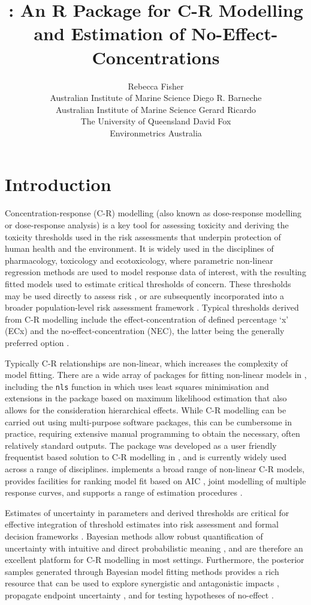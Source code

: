 \documentclass[
]{jss}
\author{
Rebecca Fisher\\Australian Institute of Marine Science \And Diego R.
Barneche\\Australian Institute of Marine Science \AND Gerard
Ricardo\\The University of Queensland \And David Fox\\Environmetrics
Australia
}
\title{\pkg{bayesnec}: An R Package for C-R Modelling and Estimation of
No-Effect-Concentrations}
\begin{document}
\hypertarget{introduction}{%
\section{Introduction}\label{introduction}}

Concentration-response (C-R) modelling (also known as dose-response
modelling or dose-response analysis) is a key tool for assessing
toxicity and deriving the toxicity thresholds used in the risk
assessments that underpin protection of human health and the
environment. It is widely used in the disciplines of pharmacology,
toxicology and ecotoxicology, where parametric non-linear regression
methods are used to model response data of interest, with the resulting
fitted models used to estimate critical thresholds of concern. These
thresholds may be used directly to assess risk \citep[e.g
see][]{fisher2018c}, or are subsequently incorporated into a broader
population-level risk assessment framework \citep[e.g.~][]{Warne2015}.
Typical thresholds derived from C-R modelling include the
effect-concentration of defined percentage `x' (ECx) and the
no-effect-concentration (NEC), the latter being the generally preferred
option \citep{Fox2008, Warne2015}.

Typically C-R relationships are non-linear, which increases the
complexity of model fitting. There are a wide array of packages for
fitting non-linear models in , including the \texttt{nls}
function in  which uses least squares minimisation and
extensions in the  package \citep{pinheiro2021} based on
maximum likelihood estimation that also allows for the consideration
hierarchical effects. While C-R modelling can be carried out using
multi-purpose software packages, this can be cumbersome in practice,
requiring extensive manual programming to obtain the necessary, often
relatively standard outputs. The  package \citep{Ritz2016} was
developed as a user friendly frequentist based solution to C-R modelling
in , and is currently widely used across a range of
disciplines.  implements a broad range of non-linear C-R
models, provides facilities for ranking model fit based on AIC
\citep{Burnham2002}, joint modelling of multiple response curves, and
supports a range of estimation procedures \citep{Ritz2016}.

Estimates of uncertainty in parameters and derived thresholds are
critical for effective integration of threshold estimates into risk
assessment and formal decision frameworks \citep{fisher2018c}. Bayesian
methods allow robust quantification of uncertainty with intuitive and
direct probabilistic meaning \citep{Ellison1996}, and are therefore an
excellent platform for C-R modelling in most settings. Furthermore, the
posterior samples generated through Bayesian model fitting methods
provides a rich resource that can be used to explore synergistic and
antagonistic impacts \citep{Fisher2019d, flores2021}, propagate endpoint
uncertainty \citep{Charles2020a, Gottschalk2013}, and for testing
hypotheses of no-effect \citep{Thomas2006}.
\end{document}
